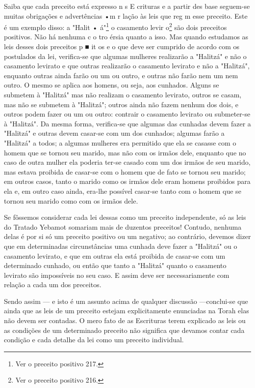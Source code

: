 \begin{itemize}
\begin{enumrate}
Saiba que cada preceito está expresso n s E crituras e a partir des base
seguem-se muitas obrigações e advertências •m r lação às leis que reg m
esse preceito. Este é um exemplo disso:
a "Halit • á"\footnote{Ver o preceito positivo 217.}
o casamento levir o\footnote{Ver o preceito positivo 216.}
são dois preceitos positivos. Não
há nenhuma c o tro érsia quanto a isso. Mas quando estudamos as leis
desses dois preceitos p ■ it os e o que deve ser cum­prido de acordo com
os postulados da lei, verifica-se que algumas mulheres realizarão a
"Halitzá" e não o casamento levirato e que outras realizarão o
casa­mento levirato e não a "Halitzá", enquanto outras ainda farão ou um
ou outro, e outras não farão nem um nem outro. O mesmo se aplica aos
homens, ou seja, aos cunhados. Alguns se submetem à "Halitzá" mas não
realizam o casamento levirato, outros se casam, mas não se submetem à
"Halitzá"; outros ainda não fazem nenhum dos dois, e outros podem fazer
ou um ou outro: contrair o casa­mento levirato ou submeter-se à
"Halitzá". Da mesma forma, verifica-se que algumas das cunhadas devem
fazer a "Halitzá" e outras devem casar-se com um dos cunhados; algumas
farão a "Halitzá" a todos; a algumas mulheres era permitido que ela se
casasse com o homem que se tornou seu marido, mas não com os irmãos
dele, enquanto que no caso de outra mulher ela poderia ter-se casado com
um dos irmãos de seu marido, mas estava proibida de casar-se com o homem
que de fato se tornou seu marido; em outros casos, tanto o marido como
os irmãos dele eram homens proibidos para ela e, em outro caso ainda,
era-lhe possível casar-se tanto com o homem que se tornou seu marido
como com os irmãos dele.

Se fôssemos considerar cada lei dessas como um preceito indepen­dente,
só as leis do Tratado Yebamot somariam mais de duzentos preceitos!
Contudo, nenhuma delas é por si só um preceito positivo ou um negativo;
ao contrário, devemos dizer que em determinadas circunstâncias uma
cunhada deve fazer a "Halitzá" ou o casamento levirato, e que em outras
ela está proibida de casar-se com um determinado cunhado, ou então que
tanto a "Halitzá" quan­to o casamento levirato são impossíveis no seu
caso. E assim deve ser necessa­riamente com relação a cada um dos
preceitos.


Sendo assim --- e isto é um assunto acima de qualquer discussão
---conclui-se que ainda que as leis de um preceito estejam
explicitamente enun­ciadas na Torah elas não devem ser contadas. O mero
fato de as Escrituras te­rem explicado as leis ou as condições de um
determinado preceito não signifi­ca que devamos contar cada condição e
cada detalhe da lei como um preceito individual.


\end{enumrate}
\end{itemize}
